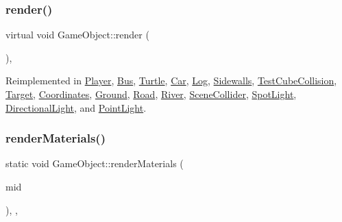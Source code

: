 \mbox{\label{class_game_object_a484efb66a7a27c101e84c11d9905d7a6}} 
\subsubsection{\texorpdfstring{render()}{render()}}
{\footnotesize\ttfamily virtual void Game\+Object\+::render (\begin{DoxyParamCaption}{ }\end{DoxyParamCaption})\hspace{0.3cm}{\ttfamily [inline]}, {\ttfamily [virtual]}}



Reimplemented in \hyperlink{class_player_a4da76233f59ad0254aa6ec533f9badcc}{Player}, \hyperlink{class_bus_a0fe709af4b2ca86583d8647f323c231c}{Bus}, \hyperlink{class_turtle_a697924198490c52307fdb006f1df7456}{Turtle}, \hyperlink{class_car_a52c7156c403d267444de3d4813fffba2}{Car}, \hyperlink{class_log_a150966688120bfd2e4f29f57bbb65031}{Log}, \hyperlink{class_sidewalls_a3459ee5dee7a73043955607c5cb51d73}{Sidewalls}, \hyperlink{class_test_cube_collision_ae5cd1052745d6acf9cbb2a6bde8b757a}{Test\+Cube\+Collision}, \hyperlink{class_target_a03e4fae56bd104dadf5cec8247452c7e}{Target}, \hyperlink{class_coordinates_afa2d40b313b3b2933f9030ebfbe31045}{Coordinates}, \hyperlink{class_ground_a558a7774ca17a4fb4455a0e0d9f66a94}{Ground}, \hyperlink{class_road_a2ca4cc3c6043f6d1044992073e9fe3ba}{Road}, \hyperlink{class_river_abf5ba1cc4356fbf57059da23e3a1997a}{River}, \hyperlink{class_scene_collider_aa46bbfb6657449115aa6855a8f46e3f5}{Scene\+Collider}, \hyperlink{class_spot_light_a05dc942328210344caff20ffd58d0eb6}{Spot\+Light}, \hyperlink{class_directional_light_aa56c9af208dd1bc66967d219297b6e67}{Directional\+Light}, and \hyperlink{class_point_light_a4584cb5e40e5dd6ab2f43ec84851152c}{Point\+Light}.

\mbox{\label{class_game_object_a7607cef4104343b5b6b91c40f8045fbd}} 
\subsubsection{\texorpdfstring{render\+Materials()}{renderMaterials()}}
{\footnotesize\ttfamily static void Game\+Object\+::render\+Materials (\begin{DoxyParamCaption}\item[{G\+Lint}]{mid }\end{DoxyParamCaption})\hspace{0.3cm}{\ttfamily [inline]}, {\ttfamily [static]}, {\ttfamily [protected]}}

